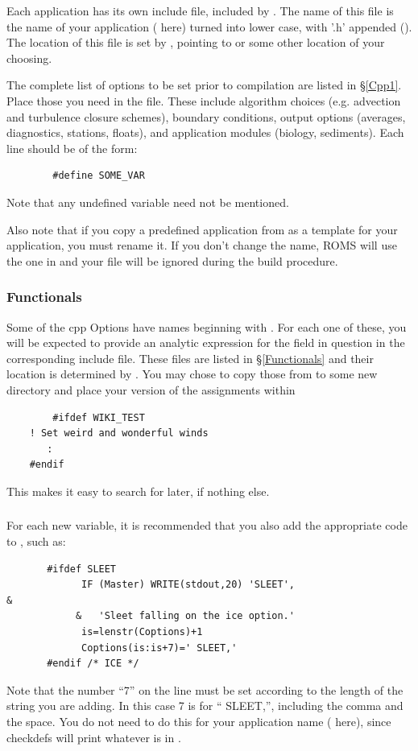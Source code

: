 Each application has its own include file, included by
. The name of this file is the name of your
application ( here) turned into lower case, with '.h'
appended (). The location of this file is set by
, pointing to  or some other
location of your choosing.

The complete list of options to be set prior to compilation are listed in
\S\ref{Cpp1}. Place those you need in the  file. These
include algorithm choices (e.g. advection and turbulence closure schemes),
boundary conditions, output options (averages, diagnostics, stations,
floats), and application modules (biology, sediments). Each line should
be of the form:
\begin{verbatim}
        #define SOME_VAR
\end{verbatim}
Note that any undefined variable need not be mentioned.

Also note that if you copy a predefined application from
 as a template for your application, you must
rename it. If you don't change the name, ROMS will use the one in
 and your file will be ignored during the build
procedure.

\subsubsection{Functionals}

Some of the cpp Options have names beginning with . For each one of
these, you will be expected to provide an analytic expression for the field
in question in the corresponding include file. These files
are listed in \S\ref{Functionals} and their location is determined
by . You may chose to copy those from
 to some new directory and place your version of
the assignments within
\begin{verbatim}
        #ifdef WIKI_TEST
	! Set weird and wonderful winds
	   :
	#endif
\end{verbatim}
This makes
it easy to search for later, if nothing else.

\subsubsection{}

For each new  variable, it is recommended that you also
add the appropriate code to , such as:
\begin{verbatim}
       #ifdef SLEET
             IF (Master) WRITE(stdout,20) 'SLEET',                      &
            &   'Sleet falling on the ice option.'
             is=lenstr(Coptions)+1
             Coptions(is:is+7)=' SLEET,'
       #endif /* ICE */
\end{verbatim}
Note that the number ``7'' on the  line must be set
according to the length of the string you are adding.  In this case 7
is for `` SLEET,'', including the comma and the space. You do not
need to do this for your application name ( here),
since checkdefs will print whatever is in .

